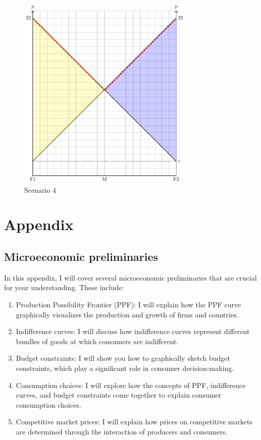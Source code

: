 \documentclass[
  12pt,
  oneside]{book}
\providecommand{\tightlist}{%
  \setlength{\itemsep}{0pt}\setlength{\parskip}{0pt}}
\theoremstyle{definition}
\theoremstyle{definition}
\theoremstyle{definition}
\theoremstyle{definition}
\theoremstyle{remark}
\begin{document}
\begin{figure}
\centering
\includegraphics[width=0.75\textwidth,height=\textheight]{fig/lau4.png}
\caption{\label{fig:lau4} Scenario 4}
\end{figure}

\hypertarget{appendix}{%
\chapter{Appendix}\label{appendix}}

\hypertarget{micro-pre}{%
\section{Microeconomic preliminaries}\label{micro-pre}}

In this appendix, I will cover several microeconomic preliminaries that are crucial for your understanding. These include:

\begin{enumerate}
\def\labelenumi{\arabic{enumi}.}
\tightlist
\item
  Production Possibility Frontier (PPF): I will explain how the PPF curve graphically visualizes the production and growth of firms and countries.
\item
  Indifference curves: I will discuss how indifference curves represent different bundles of goods at which consumers are indifferent.
\item
  Budget constraints: I will show you how to graphically sketch budget constraints, which play a significant role in consumer decision-making.
\item
  Consumption choices: I will explore how the concepts of PPF, indifference curves, and budget constraints come together to explain consumer consumption choices.
\item
  Competitive market prices: I will explain how prices on competitive markets are determined through the interaction of producers and consumers.
\end{enumerate}
\end{document}
